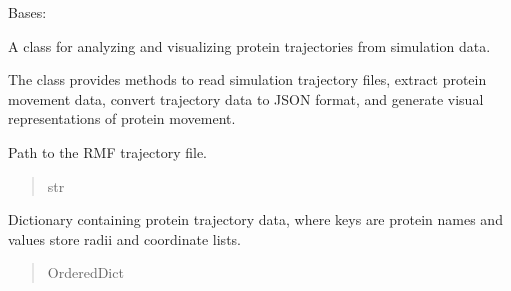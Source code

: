 \documentclass[letterpaper,10pt,english]{sphinxmanual}
\begin{document}
\begin{fulllineitems}
\label{\detokenize{src:src.Analysis_Class.Analysis}}
\pysigstartsignatures
{}
\pysigstopsignatures
\sphinxAtStartPar
Bases: 

\sphinxAtStartPar
A class for analyzing and visualizing protein trajectories from simulation data.

\sphinxAtStartPar
The  class provides methods to read simulation trajectory files, extract
protein movement data, convert trajectory data to JSON format, and generate visual
representations of protein movement.

\begin{fulllineitems}
\label{\detokenize{src:src.Analysis_Class.Analysis.trajectory_file}}
\pysigstartsignatures
{}
\pysigstopsignatures
\sphinxAtStartPar
Path to the RMF trajectory file.
\begin{quote}\begin{description}
\sphinxAtStartPar
str

\end{description}\end{quote}

\end{fulllineitems}


\begin{fulllineitems}
\label{\detokenize{src:src.Analysis_Class.Analysis.Protein_Dict}}
\pysigstartsignatures
{}
\pysigstopsignatures
\sphinxAtStartPar
Dictionary containing protein trajectory data,
where keys are protein names and values store radii and coordinate lists.
\begin{quote}\begin{description}
\sphinxAtStartPar
OrderedDict

\end{description}\end{quote}


\end{fulllineitems}
\end{fulllineitems}
\end{document}
